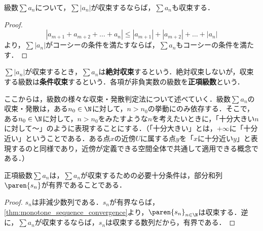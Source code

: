 \documentclass[a4paper,10pt]{ltjsarticle}
\begin{document}
\begin{MyTheorem}
  級数\(\sum a_n\)について，\(\sum |a_n|\)が収束するならば，\(\sum a_n\)も収束する．
\end{MyTheorem}
\begin{proof}
  \[ |a_{m+1} + a_{m+2} + \dots + a_n| \le |a_{m+1}| + |a_{m+2}| + \dots + |a_n| \]
  より，\(\sum |a_n|\)がコーシーの条件を満たすならば，\(\sum a_n\)もコーシーの条件を満たす．
\end{proof}

\(\sum |a_n|\)が収束するとき，\(\sum a_n\)は\textbf{絶対収束}するという．絶対収束しないが，収束する級数は\textbf{条件収束}するという．各項が非負実数の級数を\textbf{正項級数}という．

ここからは，級数の様々な収束・発散判定法について述べていく．級数\(\sum a_n\)の収束・発散は，ある\(n_0 \in \N\)に対して，\(n > n_0\)の挙動にのみ依存する．そこで，ある\(n_0 \in \N\)に対して，\(n > n_0\)をみたすような\(n\)を考えたいときに，「十分大きい\(n\)に対して～」のように表現することにする．（「十分大きい」とは，\(+\infty\)に「十分近い」ということである．ある点\(x\)の近傍\(U\)に属する点\(y\)を「\(x\)に十分近い\(y\)」と表現するのと同様であり，近傍が定義できる空間全体で共通して適用できる概念である．）

\begin{MyTheorem}
  正項級数\(\sum a_n\)は，\(\sum a_n\)が収束するための必要十分条件は，部分和列\(\paren{s_n}\)が有界であることである．
\end{MyTheorem}
\begin{proof}
  \(s_n\)は非減少数列である．\(s_n\)が有界ならば，\cref{thm:monotone_sequence_convergence}より，\(\paren{s_n}_{n\in\N}\)は収束する．逆に，\(\sum a_n\)が収束するならば，\(s_n\)は収束する数列だから，有界である．
\end{proof}
\end{document}
